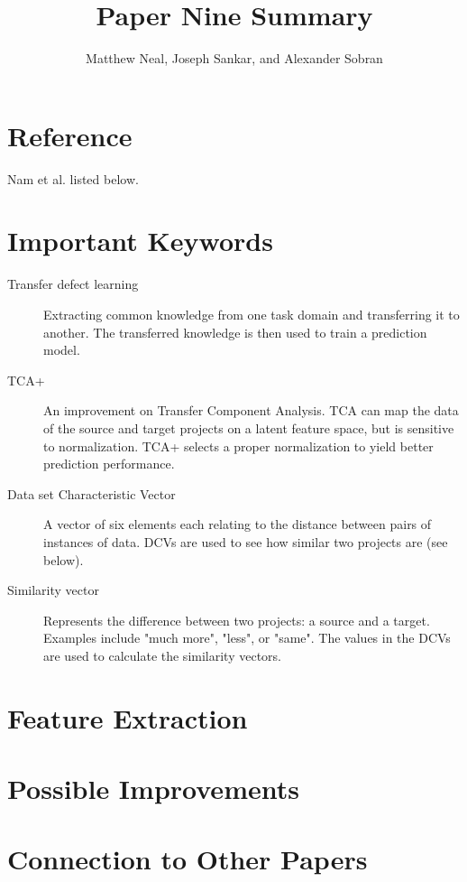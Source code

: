 \documentclass[english]{article}
\begin{document}
\title{Paper Nine Summary}


\author{Matthew Neal, Joseph Sankar, and Alexander Sobran}

\maketitle

\section*{Reference}

Nam et al. \cite{Nam} listed below.


\section*{Important Keywords}
\begin{description}
\item[{Transfer defect learning}] Extracting common knowledge from one task domain and transferring it to another. The transferred knowledge is then used to train a prediction model.
\item[{TCA+}] An improvement on Transfer Component Analysis. TCA can map the data of the source and target projects on a latent feature space, but is sensitive to normalization. TCA+ selects a proper normalization to yield better prediction performance.
\item[{Data set Characteristic Vector}] A vector of six elements each relating to the distance between pairs of instances of data. DCVs are used to see how similar two projects are (see below).
\item[{Similarity vector}] Represents the difference between two projects: a source and a target. Examples include "much more", "less", or "same". The values in the DCVs are used to calculate the similarity vectors.
\end{description}

\section*{Feature Extraction}


\section*{Possible Improvements}

\section*{Connection to Other Papers}



\end{document}
